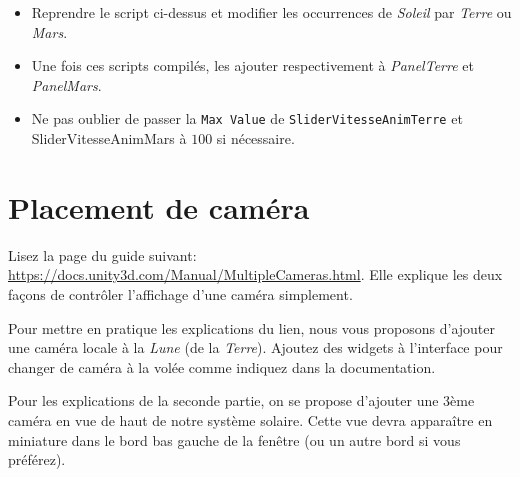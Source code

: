 \documentclass[a4paper,10pt]{article}
\newenvironment{solution}%
{\begin{tcolorbox}[breakable,colback=red!5!white,colframe=red!75!black,title=Solution]}%
{\end{tcolorbox}}
\begin{document}
\begin{solution}
\begin{itemize}
	\item Reprendre le script ci-dessus et modifier les occurrences de \textit{Soleil} par \textit{Terre} ou \textit{Mars}.
	\item Une fois ces scripts compilés, les ajouter respectivement à \textit{PanelTerre} et \textit{PanelMars}.
	\item Ne pas oublier de passer la \texttt{Max Value} de \texttt{SliderVitesseAnimTerre} et SliderVitesseAnimMars à $100$ si nécessaire.
\end{itemize}

\end{solution}
\fi 

\section{Placement de caméra}

Lisez la page du guide suivant: \url{https://docs.unity3d.com/Manual/MultipleCameras.html}. Elle explique les deux façons de contrôler l'affichage d'une caméra simplement.

Pour mettre en pratique les explications du lien, nous vous proposons d'ajouter une caméra locale à la \textit{Lune} (de la \textit{Terre}). Ajoutez des widgets à l'interface pour changer de caméra à la volée comme indiquez dans la documentation.

Pour les explications de la seconde partie, on se propose d'ajouter une 3ème caméra en vue de haut de notre système solaire. Cette vue devra apparaître en miniature dans le bord bas gauche de la fenêtre (ou un autre bord si vous préférez).
\end{document}
